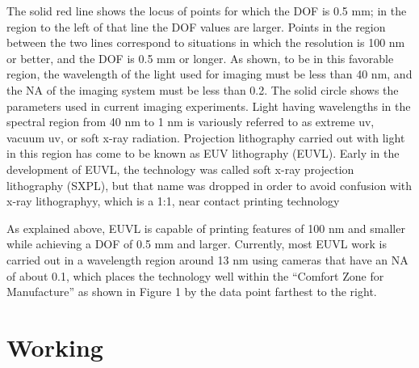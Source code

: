 \documentclass[12pt,a4paper]{report}
\begin{document}
  The solid red line shows the locus of points for which the
DOF is 0.5 mm; in the region to the left of that line the
DOF values are larger. Points in the region between the
two lines correspond to situations in which the resolution
is 100 nm or better, and the DOF is 0.5 mm or longer. As
shown, to be in this favorable region, the wavelength of
the light used for imaging must be less than 40 nm, and
the NA of the imaging system must be less than 0.2. The
solid circle shows the parameters used in current imaging
experiments. Light having wavelengths in the spectral
region from 40 nm to 1 nm is variously referred to as
extreme uv, vacuum uv, or soft x-ray radiation.
Projection lithography carried out with light in this
region has come to be known as EUV lithography
(EUVL). Early in the development of EUVL, the
technology was called soft x-ray projection lithography
(SXPL), but that name was dropped in order to avoid
confusion with x-ray lithographyy, which is a 1:1, 
near contact printing technology


As explained above, EUVL is capable of printing features
of 100 nm and smaller while achieving a DOF of 0.5 mm
and larger. Currently, most EUVL work is carried out in
a wavelength region around 13 nm using cameras that
have an NA of about 0.1, which places the technology
well within the “Comfort Zone for Manufacture” as
shown in Figure 1 by the data point farthest to the right.




\section{Working}
\end{document}
